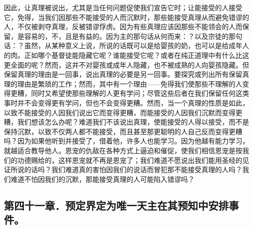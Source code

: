 因此，让真理被说出，尤其是当任何问题促使我们宣告它时；让能接受的人接受它，免得，当我们因那些不能接受的人而沉默时，那些能接受真理从而避免错谬的人，不仅被剥夺真理，反被错谬俘虏。因为有些真理应该因那些不能领会的人而保留，是容易的，不，且是有益的。因为主的那句话从何而来：？以及宗徒的那句话：？虽然，从某种意义上说，所说的话既可以是给婴孩的奶，也可以是给成年人的肉。正如哪个基督徒能隐藏它呢？谁能接受它呢？或者在纯正道理中有什么比这更全面的呢？然而，这并不对婴孩或成年人隐藏，也不被成熟的人向婴孩隐藏。但保留真理的理由是一回事，说出真理的必要是另一回事。要探究或列出所有保留真理的理由是繁琐的工作；然而，其中有一个理由——免得我们使那些不理解的人变得更糟，同时又希望使那些理解的人更有学问；尽管这些后者在我们保留任何这类事时并不会变得更有学问，但也不会变得更糟。然而，当一个真理的性质是如此，以致不能接受的人因我们说出它而变得更糟，而能接受的人因我们沉默而变得更糟，我们想该怎么办呢？难道我们不该说出真理，使能接受的人得以接受，而不是保持沉默，以致不仅两人都不能接受，而且甚至那更聪明的人自己反而变得更糟吗？因为如果他听到并接受了，借着他，许多人也能学习。因为他越有能力学习，就越适合教导他人。恩宠的仇敌在各种方式上逼迫和催促，使我们相信恩宠是按我们的功德赐给的，这样恩宠就不再是恩宠了；我们难道不愿说出我们能用圣经的见证所说的话吗？我们难道真的害怕因我们的说话而冒犯那不能接受真理的人吗？我们难道不怕因我们的沉默，那能接受真理的人可能陷入错谬吗？\par


\subsection{第四十一章．预定界定为唯一天主在其预知中安排事件。}


